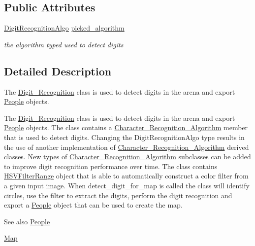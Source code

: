 \subsection*{Public Attributes}
\begin{DoxyCompactItemize}
\item 
\mbox{\label{class_image_processing_1_1_digit___recognition_abd6b1ab006d68a0f7b2ae3acc11d2a23}} 
\mbox{\hyperlink{namespace_image_processing_afe66b5cb462eb22dcf108308418c09eb}{Digit\+Recognition\+Algo}} \mbox{\hyperlink{class_image_processing_1_1_digit___recognition_abd6b1ab006d68a0f7b2ae3acc11d2a23}{picked\+\_\+algorithm}}
\begin{DoxyCompactList}\small\item\em the algorithm typed used to detect digits \end{DoxyCompactList}\end{DoxyCompactItemize}


\subsection{Detailed Description}
The \mbox{\hyperlink{class_image_processing_1_1_digit___recognition}{Digit\+\_\+\+Recognition}} class is used to detect digits in the arena and export \mbox{\hyperlink{class_people}{People}} objects. 

The \mbox{\hyperlink{class_image_processing_1_1_digit___recognition}{Digit\+\_\+\+Recognition}} class is used to detect digits in the arena and export \mbox{\hyperlink{class_people}{People}} objects. The class contains a \mbox{\hyperlink{class_image_processing_1_1_character___recognition___algorithm}{Character\+\_\+\+Recognition\+\_\+\+Algorithm}} member that is used to detect digits. Changing the Digit\+Recognition\+Algo type results in the use of another implementation of \mbox{\hyperlink{class_image_processing_1_1_character___recognition___algorithm}{Character\+\_\+\+Recognition\+\_\+\+Algorithm}} derived classes. New types of \mbox{\hyperlink{class_image_processing_1_1_character___recognition___algorithm}{Character\+\_\+\+Recognition\+\_\+\+Algorithm}} subclasses can be added to improve digit recognition performance over time. The class contains \mbox{\hyperlink{struct_image_processing_1_1_h_s_v_filter_range}{H\+S\+V\+Filter\+Range}} object that is able to automatically construct a color filter from a given input image. When detect\+\_\+digit\+\_\+for\+\_\+map is called the class will identify circles, use the filter to extract the digits, perform the digit recognition and export a \mbox{\hyperlink{class_people}{People}} object that can be used to create the map. \begin{DoxySeeAlso}{See also}
\mbox{\hyperlink{class_people}{People}} 

\mbox{\hyperlink{class_map}{Map}} 
\end{DoxySeeAlso}


